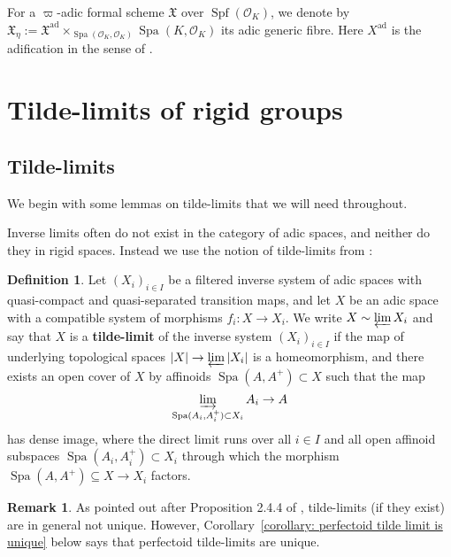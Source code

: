\documentclass[10pt,oneside]{amsart}
\theoremstyle{definition}
\newtheorem{definition}[theorem]{Definition}
\newtheorem{remark}[theorem]{Remark}
\begin{document}
	For a $\varpi$-adic formal scheme $\mathfrak X$ over $\operatorname{Spf}(\mathcal O_K)$, we denote by $\mathfrak X_\eta:=\mathfrak X^{\mathrm{ad}}\times_{\operatorname{Spa}(\mathcal O_K,\mathcal O_K)}\operatorname{Spa}(K,\mathcal O_K)$ its adic generic fibre. Here $X^{\mathrm{ad}}$ is the adification in the sense of \cite{SW}.


	
	\section{Tilde-limits of rigid groups} \label{section:tilde_limit}
  
	

		\subsection{Tilde-limits} 
	We begin with some lemmas on tilde-limits that we will need throughout.
		
	Inverse limits often do not exist in the category of adic spaces, and neither do they in rigid spaces. Instead we use the notion of tilde-limits from \cite[Definition 2.4.2]{huber2013etale}:	
	\begin{definition} 
Let $(X_i)_{i\in I}$ be a filtered inverse system of adic spaces with quasi-compact and quasi-separated transition maps, and let $X$ be an adic space with a compatible system of morphisms $f_i\colon X \rightarrow X_i$. We write $X \sim \varprojlim X_i$ and say that $X$ is a \textbf{tilde-limit} of the inverse system $(X_i)_{i\in I}$ if the map of underlying topological spaces $|X| \rightarrow \varprojlim |X_i|$ is a homeomorphism, and there exists an open cover of $X$ by affinoids $\operatorname{Spa} (A, A^+) \subset X$ such that the map 
$$ \varinjlim_{\operatorname{Spa}(A_i, A_i^+) \subset X_i} A_i \rightarrow A$$
has dense image, where the direct limit runs over all $i\in I$ and all open affinoid subspaces $\operatorname{Spa}(A_i, A_i^+) \subset X_i$ through which the morphism $\operatorname{Spa}(A, A^+) \subseteq X\rightarrow X_i$ factors.
	\end{definition}
	
	\begin{remark} \label{remark:tilde_limit_non_unique}
As pointed out after Proposition 2.4.4 of \cite{SW}, tilde-limits (if they exist) are in general not unique. However, Corollary~\ref{corollary: perfectoid tilde limit is unique} below says that perfectoid tilde-limits are unique.
	\end{remark}
\end{document}
